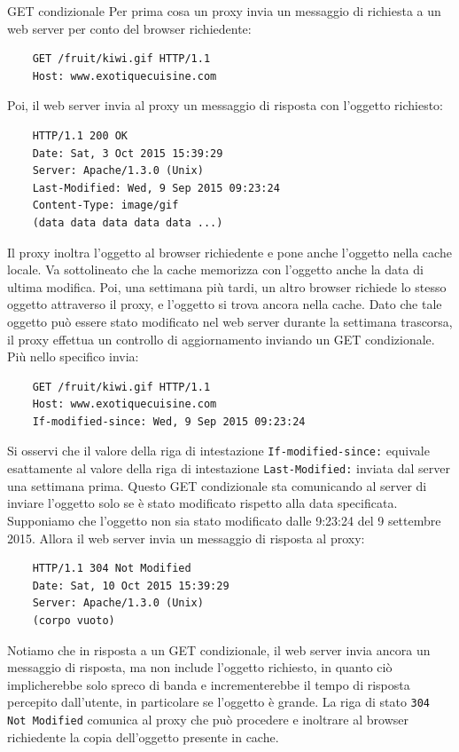 \begin{Example}{GET condizionale}{}
    Per prima cosa un proxy invia un messaggio di richiesta a un web server per conto del browser richiedente: 
    \begin{lstlisting}
    GET /fruit/kiwi.gif HTTP/1.1
    Host: www.exotiquecuisine.com
    \end{lstlisting}
    Poi, il web server invia al proxy un messaggio di risposta con l'oggetto richiesto: 
    \begin{lstlisting}
    HTTP/1.1 200 OK
    Date: Sat, 3 Oct 2015 15:39:29
    Server: Apache/1.3.0 (Unix)
    Last-Modified: Wed, 9 Sep 2015 09:23:24
    Content-Type: image/gif
    (data data data data data ...)
    \end{lstlisting}
    Il proxy inoltra l'oggetto al browser richiedente e pone anche l'oggetto nella cache locale. Va sottolineato che la cache memorizza con l'oggetto anche la data di ultima modifica. Poi, una settimana più tardi, un altro browser richiede lo stesso oggetto attraverso il proxy, e l'oggetto si trova ancora nella cache. Dato che tale oggetto può essere stato modificato nel web server durante la settimana trascorsa, il proxy effettua un controllo di aggiornamento inviando un GET condizionale. Più nello specifico invia:
    \begin{lstlisting}
    GET /fruit/kiwi.gif HTTP/1.1
    Host: www.exotiquecuisine.com
    If-modified-since: Wed, 9 Sep 2015 09:23:24
    \end{lstlisting}
    Si osservi che il valore della riga di intestazione \verb|If-modified-since:| equivale esattamente al valore della riga di intestazione \verb|Last-Modified:| inviata dal server una settimana prima. Questo GET condizionale sta comunicando al server di inviare l'oggetto solo se è stato modificato rispetto alla data specificata. Supponiamo che l'oggetto non sia stato modificato dalle 9:23:24 del 9 settembre 2015. Allora il web server invia un messaggio di risposta al proxy:
    \begin{lstlisting}
    HTTP/1.1 304 Not Modified
    Date: Sat, 10 Oct 2015 15:39:29
    Server: Apache/1.3.0 (Unix)
    (corpo vuoto)
    \end{lstlisting}
    Notiamo che in risposta a un GET condizionale, il web server invia ancora un messaggio di risposta, ma non include l'oggetto richiesto, in quanto ciò implicherebbe solo spreco di banda e incrementerebbe il tempo di risposta percepito dall'utente, in particolare se l'oggetto è grande. La riga di stato \verb|304 Not Modified| comunica al proxy che può procedere e inoltrare al browser richiedente la copia dell'oggetto presente in cache.
\end{Example}

